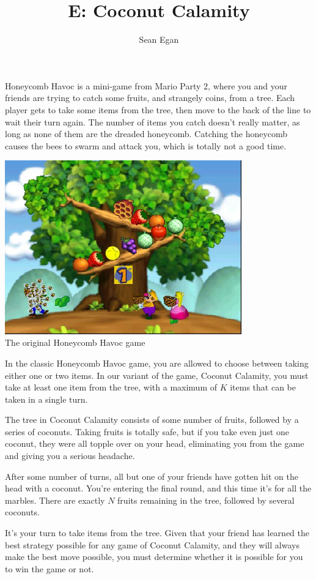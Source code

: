 \documentclass{article}
\title{E: Coconut Calamity}
\author{Sean Egan}
\begin{document}
\begin{problemDescription}
Honeycomb Havoc is a mini-game from Mario Party 2, where you and your friends are trying to catch some fruits, and strangely coins, from a tree. Each player gets to take some items from the tree, then move to the back of the line to wait their turn again. The number of items you catch doesn't really matter, as long as none of them are the dreaded honeycomb. Catching the honeycomb causes the bees to swarm and attack you, which is totally not a good time.

\begin{center}
\includegraphics[height=7.5cm]{images/honeycomb-havoc.jpg}
\\
\caption{The original Honeycomb Havoc game}
\label{fig:sp500_long_results_zoomed}
\end{center}

In the classic Honeycomb Havoc game, you are allowed to choose between taking either one or two items. In our variant of the game, Coconut Calamity, you must take at least one item from the tree, with a maximum of $K$ items that can be taken in a single turn.

The tree in Coconut Calamity consists of some number of fruits, followed by a series of coconuts. Taking fruits is totally safe, but if you take even just one coconut, they were all topple over on your head, eliminating you from the game and giving you a serious headache.

After some number of turns, all but one of your friends have gotten hit on the head with a coconut. You're entering the final round, and this time it's for all the marbles. There are exactly $N$ fruits remaining in the tree, followed by several coconuts.

It's your turn to take items from the tree. Given that your friend has learned the best strategy possible for any game of Coconut Calamity, and they will always make the best move possible, you must determine whether it is possible for you to win the game or not.

\end{problemDescription}
\end{document}
